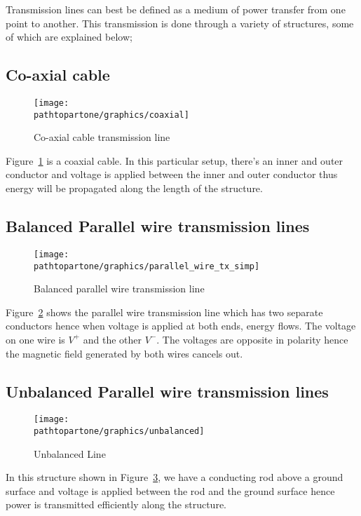 Transmission lines can best be defined as a medium of power transfer from one point to another. This transmission is done through a variety of structures, some of which are explained below;

\subsection{Co-axial cable}
\begin{figure}[h]
\centering
\texttt{[image: \\pathtopartone/graphics/coaxial]}
\caption{Co-axial cable transmission line}
\label{fig:coaxial}
\end{figure}

Figure~\ref{fig:coaxial} is a coaxial cable. In this particular setup, there’s an inner and outer conductor and voltage is applied between the inner and outer conductor thus energy will be propagated along the length of the structure.

\subsection{Balanced Parallel wire transmission lines}
\begin{figure}[h]
\centering
\texttt{[image: \\pathtopartone/graphics/parallel\_wire\_tx\_simp]}
\caption{Balanced parallel wire transmission line}
\label{fig:twowire}
\end{figure}

Figure~\ref{fig:twowire} shows the parallel wire transmission line which has two separate conductors hence when voltage is applied at both ends, energy flows. The voltage on one wire is $V^+$ and the other $V^-$. The voltages are opposite in polarity hence the magnetic field generated by both wires cancels out.

\subsection{Unbalanced Parallel wire transmission lines}
\begin{figure}[h]
\centering
\texttt{[image: \\pathtopartone/graphics/unbalanced]}
\caption{Unbalanced Line}
\label{fig:unbalanced}
\end{figure}

In this structure shown in Figure~\ref{fig:unbalanced}, we have a conducting rod above a ground surface and voltage is applied between the rod and the ground surface hence power is transmitted efficiently along the structure.

